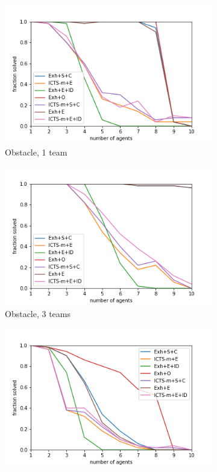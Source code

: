 \documentclass[english]{article}
\begin{document}
\begin{figure}
\begin{subfigure}{0.49\textwidth}
			\centering
			\includegraphics[width=\linewidth]{img/results/obstacle-1-p}
			\caption{Obstacle, 1 team}
			\label{fig:obstacle1p}
		\end{subfigure}
		\begin{subfigure}{0.49\textwidth}
			\centering
			\includegraphics[width=\linewidth]{img/results/obstacle-3-p}
			\caption{Obstacle, 3 teams}
			\label{fig:obstacle3p}
		\end{subfigure}
		\begin{subfigure}{0.49\textwidth}
			\centering
			\includegraphics[width=\linewidth]{img/results/maze-1-p}

\end{subfigure}
\end{figure}
\end{document}
